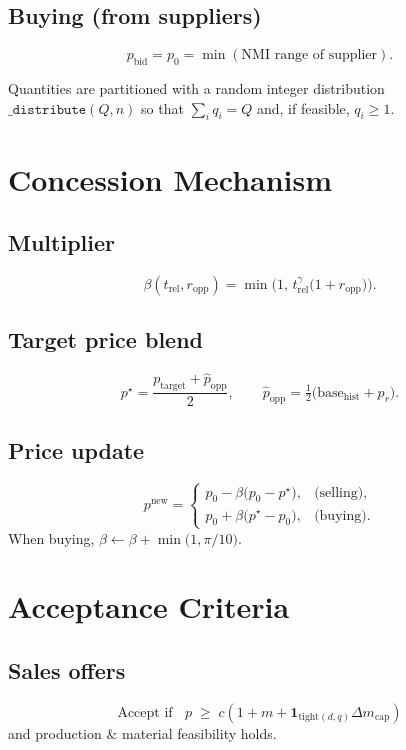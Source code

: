 \subsection*{Buying (from suppliers)}
\[
p_{\text{bid}} = p_{0}=\min(\text{NMI range of supplier}).
\]

Quantities are partitioned with a random integer distribution
\(\texttt{\_distribute}(Q,n)\) so that \(\sum_i q_i = Q\) and, if feasible, \(q_i\ge1\).

\section{Concession Mechanism}
\subsection*{Multiplier}
\[
\beta(t_{\mathrm{rel}},r_{\mathrm{opp}})
  = \min\!\bigl(1,\, t_{\mathrm{rel}}^{\gamma}\bigl(1+r_{\mathrm{opp}}\bigr)\bigr).
\]

\subsection*{Target price blend}
\[
p^{\star} = \frac{p_{\text{target}}+\hat p_{\mathrm{opp}}}{2},
\qquad
\hat p_{\mathrm{opp}} = \tfrac12\bigl(\text{base}_{\text{hist}} + p_{r}\bigr).
\]

\subsection*{Price update}
\[
p^{\text{new}}
=
\begin{cases}
p_{0} - \beta\!\bigl(p_{0}-p^{\star}\bigr), &\text{(selling)},\\[4pt]
p_{0} + \beta\!\bigl(p^{\star}-p_{0}\bigr), &\text{(buying)}.
\end{cases}
\]
When buying, \(\beta\gets \beta + \min\!\bigl(1,\pi/10\bigr)\).

\section{Acceptance Criteria}
\subsection*{Sales offers}
\[
\text{Accept if }\;\;
p \;\ge\; c\!\left(1+m+\mathbf 1_{\text{tight}(d,q)}\Delta m_{\text{cap}}\right)
\]
and production \& material feasibility holds.

